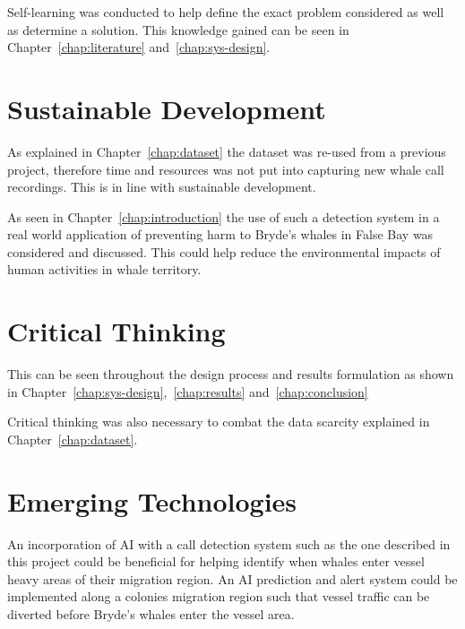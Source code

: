 Self-learning was conducted to help define the exact problem considered as well 
as determine a solution. This knowledge gained can be seen in Chapter~\ref{chap:literature} 
and~\ref{chap:sys-design}.


\section{Sustainable Development}\label{sec:ecsa_2}

As explained in Chapter~\ref{chap:dataset} the dataset was re-used 
from a previous project, therefore time and resources 
was not put into capturing new whale call recordings. This is in line with 
sustainable development. 

As seen in Chapter~\ref{chap:introduction} the use of such a 
detection system in a real world application of preventing harm 
to Bryde's whales in False Bay was considered and discussed. This could 
help reduce the environmental impacts of human activities in 
whale territory.


\section{Critical Thinking}\label{sec:ecsa_3}

This can be seen throughout the design process and results formulation as 
shown in Chapter~\ref{chap:sys-design},~\ref{chap:results} 
and~\ref{chap:conclusion}

Critical thinking was also necessary to combat the data scarcity explained 
in Chapter~\ref{chap:dataset}.

\section{Emerging Technologies}\label{sec:ecsa_4}

An incorporation of \ac{AI} with a call detection system 
such as the one described in this project could be beneficial for helping identify 
when whales enter vessel heavy areas of their migration region. An \acs{AI} 
prediction and alert system could be implemented along a colonies migration 
region such that vessel traffic can be diverted before Bryde's whales enter 
the vessel area.
